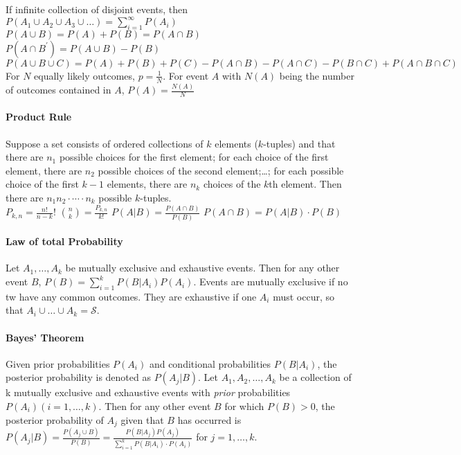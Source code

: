 \documentclass[paper=A4, pagesize, fontsize=6.95pt, DIV=calc]{scrartcl}
\begin{document}
If infinite collection of disjoint events, then $P(A_1 \cup A_2 \cup A_3 \cup \ldots) = \sum_{i=1}^{\infty}P(A_i)$ \\
$P(A \cup B) = P(A) + P(B) = P(A \cap B)$ \quad $P(A \cap B^\prime) = P(A \cup B) - P(B)$ \\
$P(A \cup B \cup C) = P(A) + P(B) + P(C) - P(A \cap B) - P(A \cap C) - P(B \cap C) + P(A \cap B \cap C)$ \\
For $N$ equally likely outcomes, $p = \frac{1}{N}$. For event $A$ with $N(A)$ being the number of outcomes contained in $A$, $P(A) = \frac{N(A)}{N}$

\paragraph{Product Rule}
Suppose a set consists of ordered collections of $k$ elements ($k$-tuples) and that there are $n_1$ possible choices for the first element; for each choice of the first element, there are $n_2$ possible choices of the second element;…; for each possible choice of the first $k - 1$ elements, there are $n_k$ choices of the $k$th element. Then there are $n_1n_2 \cdot \cdots \cdot n_k$ possible $k$-tuples. \\

$P_{k,n} = \frac{n!}{n - k}!$ \quad $\binom{n}{k} = \frac{P_{k,n}}{k!}$ \quad $P(A|B) = \frac{P(A \cap B)}{P(B)}$ \quad $P(A \cap B) = P(A | B) \cdot P(B)$

\paragraph{Law of total Probability}
Let $A_1, \ldots, A_k$ be mutually exclusive and exhaustive events. Then for any other event $B$, $P(B) = \sum_{i=1}^{k}P(B|A_i)P(A_i)$. Events are mutually exclusive if no tw have any common outcomes. They are exhaustive if one $A_i$ must occur, so that $A_i \cup \ldots \cup A_k = \mathcal{S}$.

\paragraph{Bayes' Theorem}
Given prior probabilities $P(A_i)$ and conditional probabilities $P(B|A_i)$, the posterior probability is denoted as $P(A_j|B)$. Let $A_1, A_2, \ldots, A_k$ be a collection of k mutually exclusive and exhaustive events with \textit{prior} probabilities $P(A_i) (i = 1, \ldots, k)$. Then for any other event $B$ for which $P(B) > 0$, the posterior probability of $A_j$ given that $B$ has occurred is $P(A_j|B) = \frac{P(A_j \cup B)}{P(B)} = \frac{P(B|A_j)P(A_j)}{\sum_{i=1}^{k}P(B|A_i) \cdot P(A_i)}$ for $j = 1, \ldots, k$.
\end{document}
